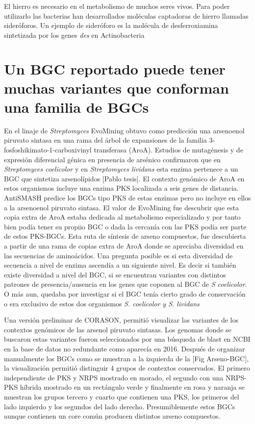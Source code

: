 \documentclass[12pt,twoside]{reedthesis}
\begin{document}
  El hierro es necesario en el metabolismo de muchos seres vivos. Para
  poder utilizarlo las bacterias han desarrollados moléculas captadoras de
  hierro llamadas sideróforos. Un ejemplo de sideróforo es la molécula de
  desferroxiamina sintetizada por los genes \emph{des} en Actinobacteria
  
  \section{Un BGC reportado puede tener muchas variantes que conforman una
  familia de
  BGCs}\label{un-bgc-reportado-puede-tener-muchas-variantes-que-conforman-una-familia-de-bgcs}
  
  En el linaje de \emph{Streptomyces} EvoMining obtuvo como predicción una
  arsenoenol piruvato sintasa en una rama del árbol de expansiones de la
  familia 3-fosfoshikimato-1-carboxivinyl transferasa (AroA). Estudios de
  mutagénesis y de expresión diferencial génica en presencia de arsénico
  confirmaron que en \emph{Streptomyces coelicolor} y en
  \emph{Streptomyces lividans} esta enzima pertenece a un BGC que
  sintetiza arsenolípidos {[}Pablo tesis{]}. El contexto genómico de AroA
  en estos organismos incluye una enzima PKS localizada a seis genes de
  distancia. AntiSMASH predice los BGCs tipo PKS de estas enzimas pero no
  incluye en ellos a la arsenoenol piruvato sintasa. El valor de EvoMining
  fue descubrir que esta copia extra de AroA estaba dedicada al
  metabolismo especializado y por tanto bien podía tener su propiio BGC o
  dada la cercanía con las PKS podía ser parte de estos PKS-BGCs. Esta
  ruta de síntesis de arseno compuestos, fue descubierta a partir de una
  rama de copias extra de AroA donde se apreciaba diversidad en las
  secuencias de aminoácidos. Una pregunta posible es si esta diversidad de
  secuencia a nivel de enzima ascendía a un siguiente nivel. Es decir si
  también existe diversidad a nivel del BGC, si se encuentran variantes
  con distintos patrones de presencia/ausencia en los genes que coponen al
  BGC de \emph{S coelicolor}. O más aun, quedaba por investigar si el BGC
  tenía cierto grado de conservación o era exclusivo de estos dos
  organismos \emph{S. coelicolor y S. lividans}
  
  Una versión preliminar de CORASON, permitió visualizar las variantes de
  los contextos genómicos de las arsenol piruvato sintasas. Los genomas
  donde se buscaron estas variantes fueron seleccionados por una búsqueda
  de blast en NCBI en la base de datos no redundante como aparecía en
  2016. Después de organizar manualmente los BGCs como se muestran a la
  izquierda de la {[}Fig Arseno-BGC{]}, la visualización permitió
  distinguir 4 grupos de contextos conservados. El primero independiente
  de PKS y NRPS mostrado en morado, el segundo con una NRPS-PKS híbrida
  mostrado en un rectángulo verde y finalmente en rosa y naranja se
  muestran los grupos tercero y cuarto que contienen una PKS, los primeros
  del lado izquierdo y los segundos del lado derecho. Presumiblemente
  estos BGCs aunque contienen un core común producen distintos arseno
  compuestos.
  
\end{document}
